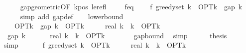 \begin{isabellebody}
\ \ \ \ \isamarkupfalse%
\ gap{\isacharunderscore}{\kern0pt}geometric{\isacharbrackleft}{\kern0pt}OF\ k{\isacharunderscore}{\kern0pt}pos\ le{\isacharunderscore}{\kern0pt}refl{\isacharbrackright}{\kern0pt}\ \isakeywordONE{{\isachardot}{\kern0pt}}\isamarkupfalse%
\isanewline
\isanewline
\ \ \isamarkupfalse%
\ f{\isacharunderscore}{\kern0pt}eq{\isacharcolon}{\kern0pt}\isanewline
\ \ \ \ {\isachardoublequoteopen}f\ {\isacharparenleft}{\kern0pt}greedy{\isacharunderscore}{\kern0pt}set\ k{\isacharparenright}{\kern0pt}\ {\isacharequal}{\kern0pt}\ OPT{\isacharunderscore}{\kern0pt}k\ {\isacharminus}{\kern0pt}\ gap\ k{\isachardoublequoteclose}\isanewline
\ \ \ \ \isamarkupfalse%
\ {\isacharparenleft}{\kern0pt}simp\ add{\isacharcolon}{\kern0pt}\ gap{\isacharunderscore}{\kern0pt}def{\isacharparenright}{\kern0pt}\isanewline
\isanewline
\ \ \isamarkupfalse%
\ lower{\isacharunderscore}{\kern0pt}bound{\isacharcolon}{\kern0pt}\isanewline
\ \ \ \ {\isachardoublequoteopen}OPT{\isacharunderscore}{\kern0pt}k\ {\isacharminus}{\kern0pt}\ gap\ k\ {\isasymge}\ OPT{\isacharunderscore}{\kern0pt}k\ {\isacharminus}{\kern0pt}\ {\isacharparenleft}{\kern0pt}{}\ {\isacharminus}{\kern0pt}\ {}\ {\isacharslash}{\kern0pt}\ real\ k{\isacharparenright}{\kern0pt}\ {\isacharcircum}{\kern0pt}\ k\ {\isacharasterisk}{\kern0pt}\ OPT{\isacharunderscore}{\kern0pt}k{\isachardoublequoteclose}\isanewline
\ \ \isamarkupfalse%
\ {\isacharminus}{\kern0pt}\isanewline
\ \ \ \ \isamarkupfalse%
\ {\isachardoublequoteopen}{\isacharminus}{\kern0pt}\ gap\ k\ {\isasymge}\ {\isacharminus}{\kern0pt}\ {\isacharparenleft}{\kern0pt}{\isacharparenleft}{\kern0pt}{}\ {\isacharminus}{\kern0pt}\ {}\ {\isacharslash}{\kern0pt}\ real\ k{\isacharparenright}{\kern0pt}\ {\isacharcircum}{\kern0pt}\ k\ {\isacharasterisk}{\kern0pt}\ OPT{\isacharunderscore}{\kern0pt}k{\isacharparenright}{\kern0pt}{\isachardoublequoteclose}\isanewline
\ \ \ \ \ \ \isamarkupfalse%
\ gap{\isacharunderscore}{\kern0pt}bound\ \isamarkupfalse%
\ simp\isanewline
\ \ \ \ \isamarkupfalse%
\ {\isacharquery}{\kern0pt}thesis\isanewline
\ \ \ \ \ \ \isamarkupfalse%
\ simp\isanewline
\ \ \isamarkupfalse%
\isanewline
\isanewline
\ \ \isamarkupfalse%
\ {\isachardoublequoteopen}f\ {\isacharparenleft}{\kern0pt}greedy{\isacharunderscore}{\kern0pt}set\ k{\isacharparenright}{\kern0pt}\ {\isasymge}\ OPT{\isacharunderscore}{\kern0pt}k\ {\isacharminus}{\kern0pt}\ {\isacharparenleft}{\kern0pt}{}\ {\isacharminus}{\kern0pt}\ {}\ {\isacharslash}{\kern0pt}\ real\ k{\isacharparenright}{\kern0pt}\ {\isacharcircum}{\kern0pt}\ k\ {\isacharasterisk}{\kern0pt}\ OPT{\isacharunderscore}{\kern0pt}k{\isachardoublequoteclose}\isanewline

\end{isabellebody}

